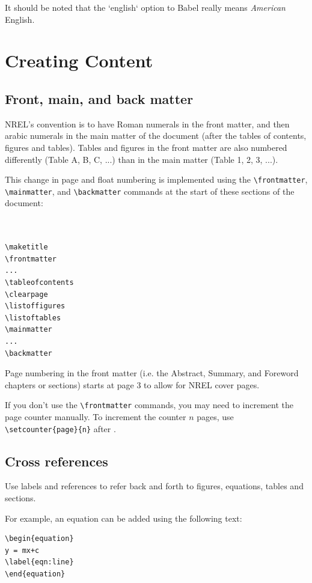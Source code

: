 It should be noted that the `english` option to Babel really means \emph{American} English.

\section{Creating Content}
\subsection{Front, main, and back matter}
NREL's convention is to have Roman numerals in the front matter, and then arabic numerals in the main matter of the document (after the tables of contents, figures and tables). Tables and figures in the front matter are also numbered differently (Table A, B, C, ...) than in the main matter (Table 1, 2, 3, ...).

This change in page and float numbering is implemented using the \verb+\frontmatter+, \verb+\mainmatter+, and \verb+\backmatter+ commands at the start of these sections of the document:

\begin{lstlisting}


\maketitle
\frontmatter
...
\tableofcontents
\clearpage
\listoffigures
\listoftables
\mainmatter
...
\backmatter

\end{lstlisting}

Page numbering in the front matter (i.e. the Abstract, Summary, and Foreword chapters or sections) starts at page 3 to allow for NREL cover pages.

If you don't use the \verb+\frontmatter+ commands, you may need to increment the page counter manually. To increment the counter $n$ pages, use \verb+\setcounter{page}{n}+ after \verb++.

\subsection{Cross references}
Use labels and references to refer back and forth to figures, equations, tables and sections. 

For example, an equation can be added using the following text:

\begin{lstlisting}
\begin{equation}
y = mx+c
\label{eqn:line}
\end{equation}
\end{lstlisting}

